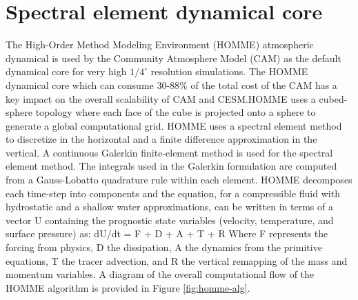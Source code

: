
\section{Spectral element dynamical core}\label{sec:algorithm}


The High-Order Method Modeling Environment (HOMME) atmospheric dynamical is used by the Community Atmosphere Model (CAM) as the default dynamical core for very high $1/4^\circ$ resolution simulations.   The HOMME dynamical core which can consume 30-88\% of the total cost of the CAM has a key impact on the overall scalability of CAM and CESM.HOMME uses a cubed-sphere topology where each face of the cube is projected onto a sphere to generate a global computational grid.  HOMME uses a spectral element method to discretize in the horizontal and a finite difference approximation \cite{simmons:1981} in the vertical. A continuous Galerkin finite-element method \cite{taylor:1997} is used for the spectral element method. The integrals used in the Galerkin formulation are computed from a Gauss-Lobatto quadrature rule within each element.  HOMME decomposes each time-step into components and the equation, for a compressible fluid with hydrostatic and a shallow water approximations, can be written in terms of a vector U containing the prognostic state variables (velocity, temperature, and surface pressure) as: 
dU/dt = F + D + A + T + R
Where F represents the forcing from physics, D the dissipation, A the dynamics from the primitive equations, T the tracer advection, and R the vertical remapping of the mass and momentum variables. A diagram of the overall computational flow of the HOMME algorithm is provided in Figure \ref{fig:homme-alg}. 


